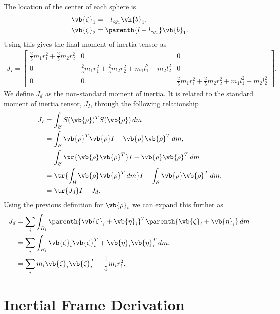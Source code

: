 \documentclass[11pt, reqno]{article}    %
\begin{document}
The location of the center of each sphere is 
\begin{align}
    \vb{\zeta}_1 &= -l_{cg_{1}} \vh{b}_1 , \\
    \vb{\zeta}_2 &= \parenth{l - l_{cg_{1}}} \vh{b}_1.
\end{align}
Using this gives the final moment of inertia tensor as
\begin{align}
    J_I = \begin{bmatrix}
        \frac{2}{5} m_1 r_1^2 + \frac{2}{5} m_2 r_2^2  & 0 & 0 \\
        0 & \frac{2}{5} m_1 r_1^2 + \frac{2}{5} m_2 r_2^2 + m_1 l_1^2 + m_2 l_2^2 & 0 \\
        0 & 0 & \frac{2}{5} m_1 r_1^2 + \frac{2}{5} m_2 r_2^2 + m_1 l_1^2 + m_2 l_2^2
    \end{bmatrix} .
\end{align}
We define \( J_d \) as the non-standard moment of inertia.
It is related to the standard moment of inertia tensor, \( J_I\), through the following relationship
\begin{align}\label{eq:nonstandard_moi}
    J_I &= \int_{\mathcal{B}} S(\vb{\rho})^T S(\vb{\rho}) \, dm \nonumber \\
    &= \int_{\mathcal{B}} \vb{\rho}^T \vb{\rho} I - \vb{\rho}\vb{\rho}^T \, dm , \nonumber \\
    &= \int_{\mathcal{B}} \tr{\vb{\rho} \vb{\rho}^T} I - \vb{\rho}\vb{\rho}^T \, dm \nonumber \\
    &= \tr{\int_{\mathcal{B}} \vb{\rho} \vb{\rho}^T \, dm} I - \int_{\mathcal{B}} \vb{\rho} \vb{\rho}^T \, dm , \nonumber \\
    &= \tr{J_d} I - J_d .
\end{align}
Using the previous definition for \( \vb{\rho}_i \) we can expand this further as
\begin{align}
    J_d &= \sum_i \int_{B_i} \parenth{\vb{\zeta}_i + \vb{\eta}_i}^T \parenth{\vb{\zeta}_i + \vb{\eta}_i} \, dm \, \\
    &= \sum_i \int_{B_i} \vb{\zeta}_i \vb{\zeta}_i^T + \vb{\eta}_i \vb{\eta}_i^T \, dm , \\
    &= \sum_i m_i \vb{\zeta}_i \vb{\zeta}_i^T + \frac{1}{5}m_i r_i^2 .
\end{align}

\section{Inertial Frame Derivation}\label{sec:inertial_eoms}
\end{document}
